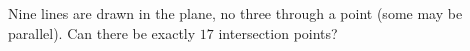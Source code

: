 Nine lines are drawn in the plane, no three through a point (some may be parallel). Can there be exactly $17$ intersection points?
